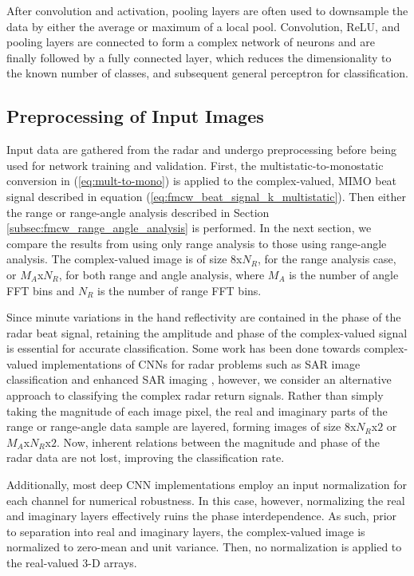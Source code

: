 \documentclass{ieeeaccess}
\begin{document}
After convolution and activation, pooling layers are often used to downsample the data by either the average or maximum of a local pool. Convolution, ReLU, and pooling layers are connected to form a complex network of neurons and are finally followed by a fully connected layer, which reduces the dimensionality to the known number of classes, and subsequent general perceptron for classification.

\subsection{Preprocessing of Input Images}
\label{subsec:cnn_input_images:complex_beat_signal}
Input data are gathered from the radar and undergo preprocessing before being used for network training and validation. First, the multistatic-to-monostatic conversion in (\ref{eq:mult-to-mono}) is applied to the complex-valued, MIMO beat signal described in equation (\ref{eq:fmcw_beat_signal_k_multistatic}). Then either the range or range-angle analysis described in Section \ref{subsec:fmcw_range_angle_analysis} is performed. In the next section, we compare the results from using only range analysis to those using range-angle analysis. The complex-valued image is of size $8$x$N_R$, for the range analysis case, or $M_A$x$N_R$, for both range and angle analysis, where $M_A$ is the number of angle FFT bins and $N_R$ is the number of range FFT bins. 

Since minute variations in the hand reflectivity are contained in the phase of the radar beat signal, retaining the amplitude and phase of the complex-valued signal is essential for accurate classification. Some work has been done towards complex-valued implementations of CNNs for radar problems such as SAR image classification \cite{cvcnn:sar_classification} and enhanced SAR imaging \cite{cvcnn:sar_imaging}, however, we consider an alternative approach to classifying the complex radar return signals. Rather than simply taking the magnitude of each image pixel, the real and imaginary parts of the range or range-angle data sample are layered, forming images of size $8$x$N_R$x$2$ or $M_A$x$N_R$x$2$. Now, inherent relations between the magnitude and phase of the radar data are not lost, improving the classification rate. 

Additionally, most deep CNN implementations employ an input normalization for each channel for numerical robustness. In this case, however, normalizing the real and imaginary layers effectively ruins the phase interdependence. As such, prior to separation into real and imaginary layers, the complex-valued image is normalized to zero-mean and unit variance. Then, no normalization is applied to the real-valued 3-D arrays.
\end{document}
